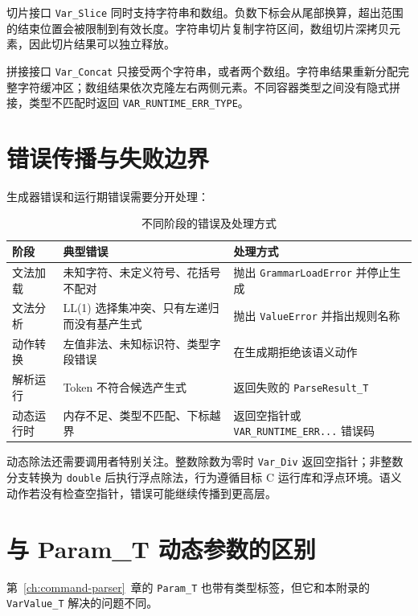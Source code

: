 切片接口 \texttt{Var\_Slice} 同时支持字符串和数组。负数下标会从尾部换算，超出范围的结束位置会被限制到有效长度。字符串切片复制字符区间，数组切片深拷贝元素，因此切片结果可以独立释放。

拼接接口 \texttt{Var\_Concat} 只接受两个字符串，或者两个数组。字符串结果重新分配完整字符缓冲区；数组结果依次克隆左右两侧元素。不同容器类型之间没有隐式拼接，类型不匹配时返回 \texttt{VAR\_RUNTIME\_ERR\_TYPE}。

\section{错误传播与失败边界}

生成器错误和运行期错误需要分开处理：

\begin{table}[htbp]
\centering
\caption{不同阶段的错误及处理方式} \label{tab:app-parser-errors}
\begin{tabularx}{\textwidth}{llX}
\toprule
阶段 & 典型错误 & 处理方式 \\
\midrule
文法加载 & 未知字符、未定义符号、花括号不配对 & 抛出 \texttt{GrammarLoadError} 并停止生成 \\
文法分析 & LL(1) 选择集冲突、只有左递归而没有基产生式 & 抛出 \texttt{ValueError} 并指出规则名称 \\
动作转换 & 左值非法、未知标识符、类型字段错误 & 在生成期拒绝该语义动作 \\
解析运行 & Token 不符合候选产生式 & 返回失败的 \texttt{ParseResult\_T} \\
动态运行时 & 内存不足、类型不匹配、下标越界 & 返回空指针或 \texttt{VAR\_RUNTIME\_ERR...} 错误码 \\
\bottomrule
\end{tabularx}
\end{table}

动态除法还需要调用者特别关注。整数除数为零时 \texttt{Var\_Div} 返回空指针；非整数分支转换为 \texttt{double} 后执行浮点除法，行为遵循目标 C 运行库和浮点环境。语义动作若没有检查空指针，错误可能继续传播到更高层。

\section{与 Param\_T 动态参数的区别}

第~\ref{ch:command-parser}~章的 \texttt{Param\_T} 也带有类型标签，但它和本附录的 \texttt{VarValue\_T} 解决的问题不同。

